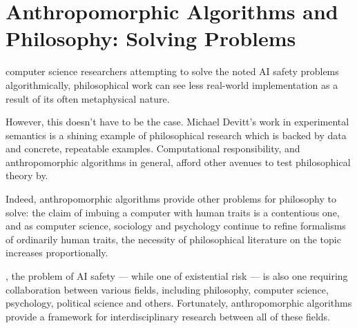 \section{Anthropomorphic Algorithms and Philosophy: Solving Problems}

 computer science researchers attempting to solve the noted AI safety problems algorithmically, philosophical work can see less real-world implementation as a result of its often metaphysical nature.\par

However, this doesn't have to be the case. Michael Devitt's work in experimental semantics\cite{experimental_semantics} is a shining example of philosophical research which is backed by data and concrete, repeatable examples. Computational responsibility, and anthropomorphic algorithms in general, afford other avenues to test philosophical theory by.\par

Indeed, anthropomorphic algorithms provide other problems for philosophy to solve: the claim of imbuing a computer with human traits is a contentious one, and as computer science, sociology and psychology continue to refine formalisms of ordinarily human traits, the necessity of philosophical literature on the topic increases proportionally.\par
, the problem of AI safety --- while one of existential risk --- is also one requiring collaboration between various fields, including philosophy, computer science, psychology, political science and others. Fortunately, anthropomorphic algorithms provide a framework for interdisciplinary research between all of these fields.\par

